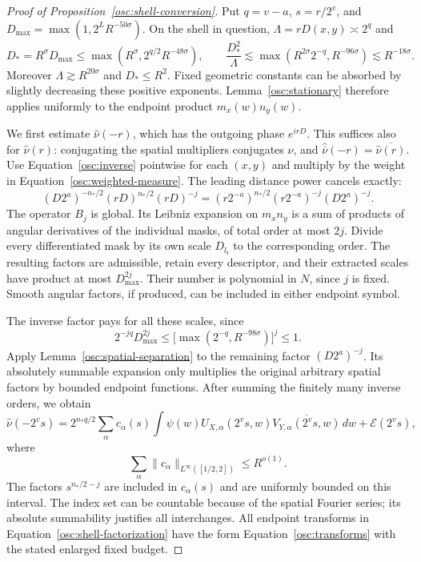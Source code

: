 \begin{proof}[Proof of Proposition~\ref{osc:shell-conversion}]
Put $q=v-a$, $s=r/2^v$, and
$D_{\max}=\max(1,2^L R^{-50\sigma})$.  On the shell in question,
$\Lambda=rD(x,y)\asymp2^q$ and
\[
 D_*=R^\sigma D_{\max}
 \le\max(R^\sigma,2^{q/2}R^{-48\sigma}),\qquad
 \frac{D_*^2}{\Lambda}
 \lesssim\max(R^{2\sigma}2^{-q},R^{-96\sigma})
 \lesssim R^{-18\sigma}.
\]
Moreover $\Lambda\gtrsim R^{20\sigma}$ and $D_*\le R^2$.
Fixed geometric constants can be absorbed by slightly decreasing these
positive exponents.  Lemma~\ref{osc:stationary} therefore applies
uniformly to the endpoint product
$m_x(w)n_y(w)$.

We first estimate $\widehat\nu(-r)$, which has the outgoing phase
$e^{irD}$.  This suffices also for $\widehat\nu(r)$: conjugating the
spatial multipliers conjugates $\nu$, and
$\widehat{\overline\nu}(-r)=\overline{\widehat\nu(r)}$.
Use Equation~\eqref{osc:inverse} pointwise for each $(x,y)$ and multiply
by the weight in Equation~\eqref{osc:weighted-measure}.  The leading
distance power cancels exactly:
\begin{equation}\label{osc:weight-cancellation}
 (D2^a)^{-n_*/2}(rD)^{n_*/2}(rD)^{-j}
 = (r2^{-a})^{n_*/2}(r2^{-a})^{-j}(D2^a)^{-j}.
\end{equation}
The operator $B_j$ is global.  Its Leibniz expansion on $m_xn_y$ is a
sum of products of angular derivatives of the individual masks, of
total order at most $2j$.  Divide every differentiated mask by its own
scale $D_{l_{\mathfrak t}}$ to the corresponding order.  The resulting factors are
admissible, retain every descriptor, and their extracted scales have
product at most $D_{\max}^{2j}$.  Their number is polynomial in $N$,
since $j$ is fixed.  Smooth angular factors, if produced, can be
included in either endpoint symbol.

The inverse factor pays for all these scales, since
\begin{equation}\label{osc:scale-payment}
 2^{-jq}D_{\max}^{2j}
 \le\bigl[\max(2^{-q},R^{-98\sigma})\bigr]^j\le1.
\end{equation}
Apply Lemma~\ref{osc:spatial-separation} to the remaining factor
$(D2^a)^{-j}$.  Its absolutely summable expansion only multiplies the
original arbitrary spatial factors by bounded endpoint functions.
After summing the finitely many inverse orders, we obtain
\begin{equation}\label{osc:shell-factorization}
 \widehat\nu(-2^vs)
  =2^{n_*q/2}\sum_\alpha c_\alpha(s)
       \int\psi(w)U_{X,\alpha}(2^vs,w)
                       \overline{V_{Y,\alpha}(2^vs,w)}\,dw
       +\mathcal E(2^vs),
\end{equation}
where
\[
 \sum_\alpha\|c_\alpha\|_{L^\infty([1/2,2])}
 \le R^{o(1)}.
\]
The factors $s^{n_*/2-j}$ are included in $c_\alpha(s)$ and are
uniformly bounded on this interval.  The index set can be countable
because of the spatial Fourier series; its absolute summability
justifies all interchanges.  All endpoint transforms in
Equation~\eqref{osc:shell-factorization} have the form
Equation~\eqref{osc:transforms} with the stated enlarged fixed budget.


\end{proof}
